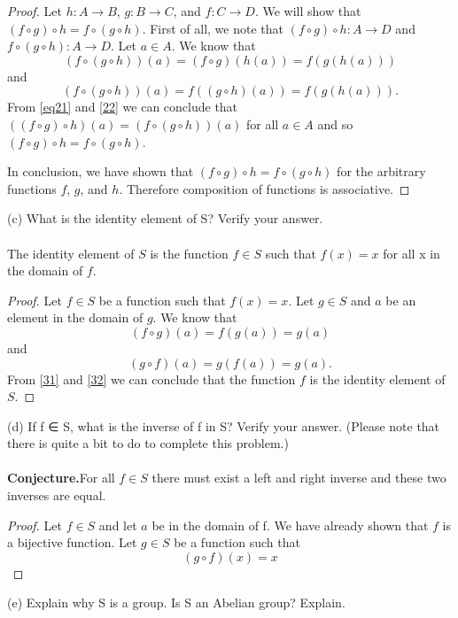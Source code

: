 \documentclass[11pt,a4paper]{article}
\begin{document}
\begin{proof}
Let $h:A\rightarrow B$, $g:B\rightarrow C$, and $f:C\rightarrow D$. We will show that $(f\circ g)\circ h = f\circ (g\circ h)$. First of all, we note that $(f\circ g)\circ h:A\rightarrow D$ and $f\circ (g\circ h):A\rightarrow D$. Let $a\in A$. We know that
\begin{equation}\label{eq21}
(f\circ(g\circ h))(a)=(f\circ g)(h(a))=f(g(h(a)))
\end{equation}
and
\begin{equation}\label{22}
(f\circ(g\circ h))(a) = f((g\circ h)(a)) = f(g(h(a))).
\end{equation}
From \eqref{eq21} and \eqref{22} we can conclude that $((f\circ g)\circ h)(a) = (f\circ (g\circ h))(a)$ for all $a\in A$ and so  $(f\circ g)\circ h = f\circ (g\circ h)$.

In conclusion, we have shown that $(f\circ g)\circ h = f\circ (g\circ h)$ for the arbitrary functions $f$, $g$, and $h$. Therefore composition of functions is associative.
\end{proof}

(c) What is the identity element of S? Verify your answer.\\
~\\
The identity element of $S$ is the function $f\in S$ such that $f(x)=x$ for all x in the domain of $f$.

\begin{proof}
Let $f\in S$ be a function such that $f(x)=x$. Let $g\in S$ and $a$ be an element in the domain of $g$. We know that
\begin{equation}\label{31}
(f\circ g)(a) = f(g(a)) = g(a)
\end{equation}
and
\begin{equation}\label{32}
(g\circ f)(a) = g(f(a)) = g(a).
\end{equation}
From \eqref{31} and \eqref{32} we can conclude that the function $f$ is the identity element of $S$.
\end{proof}

(d) If f ∈ S, what is the inverse of f in S? Verify your answer. (Please note
that there is quite a bit to do to complete this problem.)\\
~\\
{\bf Conjecture.}For all $f\in S$ there must exist a left and right inverse and these two inverses are equal.
\begin{proof}
Let $f\in S$ and let $a$ be in the domain of f. We have already shown that $f$ is a bijective function. Let $g\in S$ be a function such that
\begin{equation}
(g\circ f)(x) = x
\end{equation}
\end{proof}
(e) Explain why S is a group. Is S an Abelian group? Explain.
\end{document}
